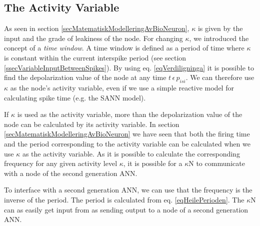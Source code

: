  		\subsection{The Activity Variable} %

	As seen in section \ref{secMatematiskModelleringAvBioNeuron}, $\kappa$ is given by the input and the grade of leakiness of the node.
	For changing $\kappa$, we introduced the concept of a \emph{time window}. 
	A time window is defined as a period of time where $\kappa$ is constant within the current interspike period (see section \ref{ssecVariableInputBetweenSpikes}).
	By using eq. \eqref{eqVerdiligninga} it is possible to find the depolarization value of the node at any time $t \, \epsilon \, p_{isi}$.
	We can therefore use $\kappa$ as the node's activity variable, even if we use a simple reactive model for calculating spike time (e.g. the SANN model). %

	If $\kappa$ is used as the activity variable, more than the depolarization value of the node can be calculated by its activity variable. 
	In section \ref{secMatematiskModelleringAvBioNeuron} we have seen that both the firing time and the period corresponding to the activity variable can be calculated when we use $\kappa$ as the activity variable.
	As it is possible to calculate the corresponding frequency for any given activity level $\kappa$, it is possible for a $\kappa$N to communicate with a node of the second generation ANN.

	To interface with a second generation ANN, we can use that the frequency is the inverse of the period. 
	The period is calculated from eq. \eqref{eqHeilePerioden}.
	The $\kappa$N can as easily get input from as sending output to a node of a second generation ANN. 


